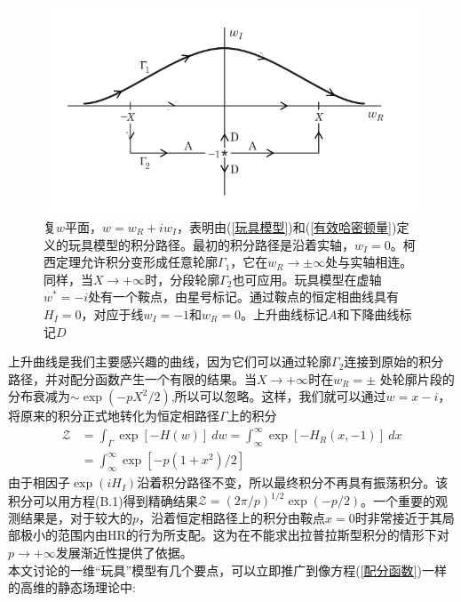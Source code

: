 \begin{figure}[H]
      \centering
      \includegraphics[width=12cm]{./figures/1.png}
      \caption{复$w$平面，$w =w_R + iw_I$，表明由(\ref{玩具模型})和(\ref{有效哈密顿量})定义的玩具模型的积分路径。最初的积分路径是沿着实轴，$w_I=0$。柯西定理允许积分变形成任意轮廓$\Gamma_1$，它在$w_R \rightarrow \pm \infty $处与实轴相连。同样，当$X \rightarrow +\infty$时，分段轮廓$\Gamma_2$也可应用。玩具模型在虚轴$w^*= -i$处有一个鞍点，由星号标记。通过鞍点的恒定相曲线具有$H_I=0$，对应于线$w_I=-1$和$w_R=0$。上升曲线标记$A$和下降曲线标记$D$}
      \label{复平面w}
\end{figure}
上升曲线是我们主要感兴趣的曲线，因为它们可以通过轮廓$\Gamma_2$连接到原始的积分路径，并对配分函数产生一个有限的结果。当$ X \rightarrow +\infty$时在$w_R=\pm$ 处轮廓片段的分布衰减为$\sim \exp(-pX^2/2)$,所以可以忽略。这样，我们就可以通过$w =x -i$，将原来的积分正式地转化为恒定相路径$\Gamma$上的积分\\
\begin{equation}
\begin{aligned}
\mathcal{Z} &= \int_\Gamma \exp[-H(w)] \ dw = \int_\infty^\infty \exp[-H_R(x,-1)] \ dx\\
& =\int_\infty^\infty \exp[-p(1+x^2)/2]\label{恒定相路径积分}
\end{aligned}
\end{equation}
由于相因子$\exp(iH_I)$沿着积分路径不变，所以最终积分不再具有振荡积分。该积分可以用方程(B.1)得到精确结果$\mathcal{Z}=(2\pi/p)^{1/2}\exp(−p/2)$。一个重要的观测结果是，对于较大的$p$，沿着恒定相路径上的积分由鞍点$x=0$时非常接近于其局部极小的范围内由HR的行为所支配。这为在不能求出拉普拉斯型积分的情形下对$p\rightarrow +\infty$发展渐近性提供了依据。\\

本文讨论的一维“玩具”模型有几个要点，可以立即推广到像方程(\ref{配分函数})一样的高维的静态场理论中:\\

